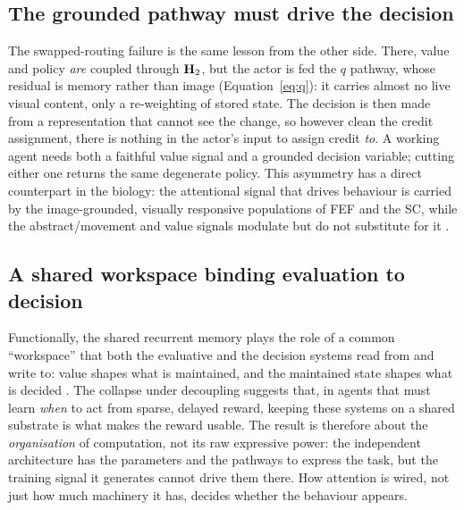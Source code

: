 \subsection{The grounded pathway must drive the decision}
The swapped-routing failure is the same lesson from the other side. There, value and
policy \emph{are} coupled through $\mathbf{H}_2$, but the actor is fed the $q$ pathway, whose
residual is memory rather than image (Equation~\ref{eq:q}): it carries almost no live
visual content, only a re-weighting of stored state. The decision is then made from a
representation that cannot see the change, so however clean the credit assignment,
there is nothing in the actor's input to assign credit \emph{to}. A working agent
needs both a faithful value signal and a grounded decision variable; cutting either
one returns the same degenerate policy. This asymmetry has a direct counterpart in the
biology: the attentional signal that drives behaviour is carried by the
image-grounded, visually responsive populations of FEF and the SC, while the
abstract/movement and value signals modulate but do not substitute for it
\citep{thompson2005neuronal, gregoriou2012lesions, zenon2012attention, gold2007neural}.

\subsection{A shared workspace binding evaluation to decision}
Functionally, the shared recurrent memory plays the role of a common ``workspace''
that both the evaluative and the decision systems read from and write to: value shapes
what is maintained, and the maintained state shapes what is decided
\citep{baars1988cognitive, dehaene2011experimental, miller2001integrative}. The
collapse under decoupling suggests that, in agents that must learn \emph{when} to act
from sparse, delayed reward, keeping these systems on a shared substrate is what makes
the reward usable. The result is therefore about the \emph{organisation} of
computation, not its raw expressive power: the independent architecture has the
parameters and the pathways to express the task, but the training signal it generates
cannot drive them there. How attention is wired, not just how much machinery it has,
decides whether the behaviour appears.
